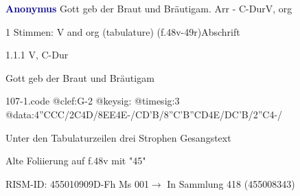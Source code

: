 \documentclass[twocolumn]{book}
\begin{document}
\par \vspace{7pt} \textcolor{darkblue}{\textbf{Anonymus  }}\hfillplus{\textbf{[107]}}\newline Gott geb der Braut und Bräutigam. Arr - C-Dur\newline V, org
\par \begin{itshape}\end{itshape} 
\par \textcolor{darkblue}{}  1 Stimmen: V and org (tabulature)  (f.48v-49r)\newline Abschrift
\par 1.1.1  V, C-Dur\newline \begin{footnotesize} Gott geb der Braut und Bräutigam \end{footnotesize}  
\begin{filecontents*}{107-1.code}
@clef:G-2
@keysig:
@timesig:3
@data:4''CCC/2C4D/{8EE}4E-/CD'B/{8''C'B''CD}4E/DC'B/2''C4-/
\end{filecontents*}
\newline
%
\par Unter den Tabulaturzeilen drei Strophen Gesangstext
\par Alte Foliierung auf f.48v mit "45"
\par RISM-ID: 455010909\newline D-Fh  Ms 001\newline $\rightarrow$ In Sammlung 418 (455008343)
      
\end{document}
